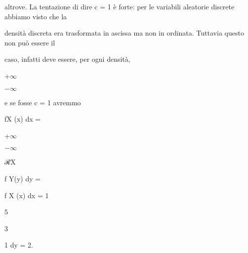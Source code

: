 \documentclass[a4paper,portrait,12pt]{article}
\begin{document}
\begin{flushleft}
altrove. La tentazione di dire c = 1 \`{e} forte: per le variabili aleatorie discrete abbiamo visto che la
\end{flushleft}


\begin{flushleft}
densit\`{a} discreta era trasformata in ascissa ma non in ordinata. Tuttavia questo non pu\`{o} essere il
\end{flushleft}


\begin{flushleft}
caso, infatti deve essere, per ogni densit\`{a},
\end{flushleft}


+$\infty$


$-$$\infty$





\begin{flushleft}
e se fosse c = 1 avremmo
\end{flushleft}





\begin{flushleft}
fX (x) dx =
\end{flushleft}





+$\infty$


$-$$\infty$





\begin{flushleft}
ℛX
\end{flushleft}





\begin{flushleft}
f Y(y) dy =
\end{flushleft}





\begin{flushleft}
f X (x) dx = 1
\end{flushleft}


5





3





\begin{flushleft}
1 dy = 2.
\end{flushleft}
\end{document}
